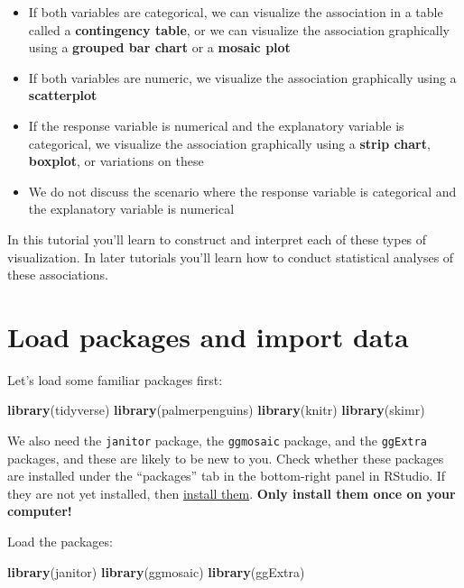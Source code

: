 \documentclass[
]{book}
\newenvironment{Shaded}{\begin{snugshade}}{\end{snugshade}}
\newcommand{\FunctionTok}[1]{\textcolor[rgb]{0.13,0.29,0.53}{\textbf{#1}}}
\newcommand{\NormalTok}[1]{#1}
\providecommand{\tightlist}{%
  \setlength{\itemsep}{0pt}\setlength{\parskip}{0pt}}
\begin{document}
\begin{itemize}
\tightlist
\item
  If both variables are categorical, we can visualize the association in a table called a \textbf{contingency table}, or we can visualize the association graphically using a \textbf{grouped bar chart} or a \textbf{mosaic plot}
\item
  If both variables are numeric, we visualize the association graphically using a \textbf{scatterplot}
\item
  If the response variable is numerical and the explanatory variable is categorical, we visualize the association graphically using a \textbf{strip chart}, \textbf{boxplot}, or variations on these
\item
  We do not discuss the scenario where the response variable is categorical and the explanatory variable is numerical
\end{itemize}

In this tutorial you'll learn to construct and interpret each of these types of visualization. In later tutorials you'll learn how to conduct statistical analyses of these associations.

\section{Load packages and import data}\label{vis2_packages_data}

Let's load some familiar packages first:

\begin{Shaded}
\begin{Highlighting}[]
\FunctionTok{library}\NormalTok{(tidyverse)}
\FunctionTok{library}\NormalTok{(palmerpenguins)}
\FunctionTok{library}\NormalTok{(knitr)}
\FunctionTok{library}\NormalTok{(skimr)}
\end{Highlighting}
\end{Shaded}

We also need the \texttt{janitor} package, the \texttt{ggmosaic} package, and the \texttt{ggExtra} packages, and these are likely to be new to you. Check whether these packages are installed under the ``packages'' tab in the bottom-right panel in RStudio. If they are not yet installed, then \hyperref[package_install]{install them}. \textbf{Only install them once on your computer!}

Load the packages:

\begin{Shaded}
\begin{Highlighting}[]
\FunctionTok{library}\NormalTok{(janitor)}
\FunctionTok{library}\NormalTok{(ggmosaic)}
\FunctionTok{library}\NormalTok{(ggExtra)}
\end{Highlighting}
\end{Shaded}
\end{document}
